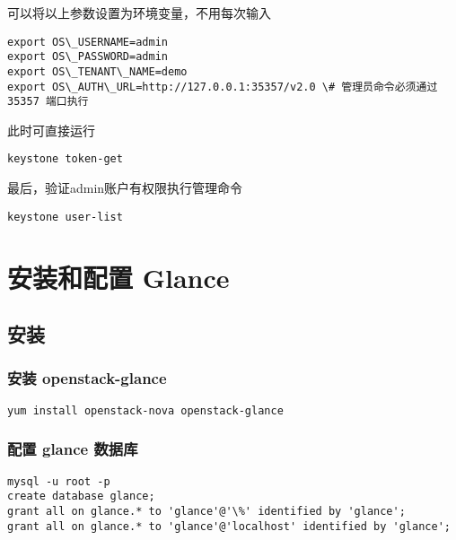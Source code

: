 \documentclass[a4paper,12pt,english]{sphinxmanual}
\begin{document}
可以将以上参数设置为环境变量，不用每次输入

\begin{Verbatim}[commandchars=\\\{\}]
export OS\_USERNAME=admin
export OS\_PASSWORD=admin
export OS\_TENANT\_NAME=demo
export OS\_AUTH\_URL=http://127.0.0.1:35357/v2.0 \# 管理员命令必须通过 35357 端口执行
\end{Verbatim}

此时可直接运行

\begin{Verbatim}[commandchars=\\\{\}]
keystone token-get
\end{Verbatim}

最后，验证admin账户有权限执行管理命令

\begin{Verbatim}[commandchars=\\\{\}]
keystone user-list
\end{Verbatim}


\chapter{安装和配置 Glance}
\label{glance:glance}\label{glance::doc}

\section{安装}
\label{glance:id1}

\subsection{安装 openstack-glance}
\label{glance:openstack-glance}
\begin{Verbatim}[commandchars=\\\{\}]
yum install openstack-nova openstack-glance
\end{Verbatim}


\subsection{配置 glance 数据库}
\label{glance:id2}
\begin{Verbatim}[commandchars=\\\{\}]
mysql -u root -p
create database glance;
grant all on glance.* to 'glance'@'\%' identified by 'glance';
grant all on glance.* to 'glance'@'localhost' identified by 'glance';
\end{Verbatim}
\end{document}
